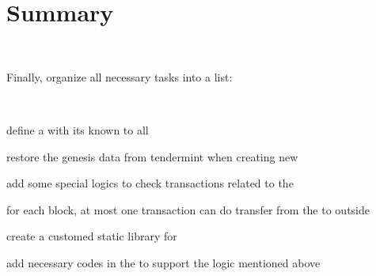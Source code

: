 \section{Summary}

~\par

Finally, organize all necessary tasks into a list:

~\par

\begin{ENUMERATE}
\item define a  with its  known to all
    \item restore the genesis data from tendermint when creating new 
    \item add some special logics to check transactions related to the 
    \item for each block, at most one transaction can do transfer from the  to outside
    \item create a customed  static library for 
    \item add necessary codes in the  to support the logic mentioned above
\end{ENUMERATE}
